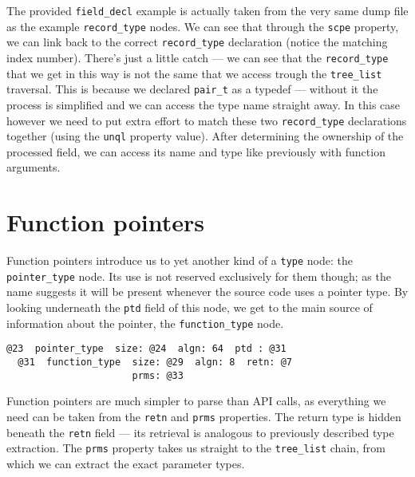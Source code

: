 \documentclass[polish, english]{iithesis}
\begin{document}
The provided \texttt{field\_decl} example is actually taken from the very same dump file as the example \texttt{record\_type} nodes.
We can see that through the \texttt{scpe} property, we can link back to the correct \texttt{record\_type} declaration (notice the matching index number).
There's just a little catch --- we can see that the \texttt{record\_type} that we get in this way is not the same that we access trough the \texttt{tree\_list} traversal.
This is because we declared \texttt{pair\_t} as a typedef --- without it the process is simplified and we can access the type name straight away.
In this case however we need to put extra effort to match these two \texttt{record\_type} declarations together (using the \texttt{unql} property value).
After determining the ownership of the processed field, we can access its name and type like previously with function arguments.
  \section{Function pointers}
Function pointers introduce us to yet another kind of a \texttt{type} node: the \texttt{pointer\_type} node.
Its use is not reserved exclusively for them though; as the name suggests it will be present whenever the source code uses a pointer type.
By looking underneath the \texttt{ptd} field of this node, we get to the main source of information about the pointer, the \texttt{function\_type} node.
\begin{lstlisting}[caption=Example \texttt{pointer\_type} and \texttt{function\_type} nodes]
  @23  pointer_type  size: @24  algn: 64  ptd : @31
  @31  function_type  size: @29  algn: 8  retn: @7      
                      prms: @33
\end{lstlisting} 
Function pointers are much simpler to parse than API calls, as everything we need can be taken from the \texttt{retn} and \texttt{prms} properties.
The return type is hidden beneath the \texttt{retn} field --- its retrieval is analogous to previously described type extraction.
The \texttt{prms} property takes us straight to the \texttt{tree\_list} chain, from which we can extract the exact parameter types.
\end{document}
